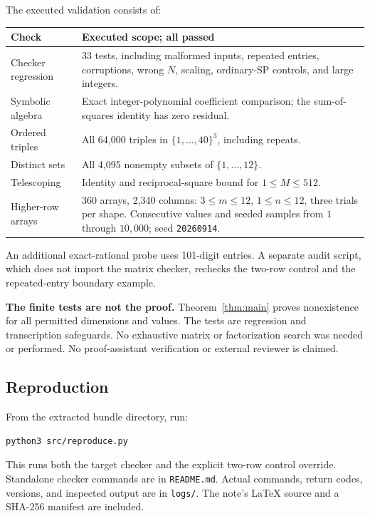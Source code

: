 \documentclass[11pt]{article}
\begin{document}
The executed validation consists of:
\begin{center}
\small
\begin{tabular}{@{}lp{10cm}@{}}
\toprule
Check & Executed scope; all passed\\
\midrule
Checker regression & 33 tests, including malformed inputs, repeated entries,
corruptions, wrong $N$, scaling, ordinary-SP controls, and large integers.\\[3pt]
Symbolic algebra & Exact integer-polynomial coefficient comparison; the
sum-of-squares identity has zero residual.\\[3pt]
Ordered triples & All 64,000 triples in $\{1,\ldots,40\}^3$, including repeats.\\[3pt]
Distinct sets & All 4,095 nonempty subsets of $\{1,\ldots,12\}$.\\[3pt]
Telescoping & Identity and reciprocal-square bound for $1\le M\le512$.\\[3pt]
Higher-row arrays & 360 arrays, 2,340 columns: $3\le m\le12$, $1\le n\le12$,
three trials per shape. Consecutive values and seeded samples from
$1$ through $10{,}000$; seed \texttt{20260914}.\\
\bottomrule
\end{tabular}
\end{center}
An additional exact-rational probe uses 101-digit entries. A separate audit
script, which does not import the matrix checker, rechecks the two-row
control and the repeated-entry boundary example.

\textbf{The finite tests are not the proof.} Theorem~\ref{thm:main} proves
nonexistence for all permitted dimensions and values. The tests are regression
and transcription safeguards. No exhaustive matrix or factorization search
was needed or performed. No proof-assistant verification or external reviewer
is claimed.

\subsection*{Reproduction}
From the extracted bundle directory, run:
\begin{verbatim}
python3 src/reproduce.py
\end{verbatim}
This runs both the target checker and the explicit two-row control override.
Standalone checker commands are in \texttt{README.md}. Actual commands,
return codes, versions, and inspected output are in \texttt{logs/}.
The note's \LaTeX{} source and a SHA-256 manifest are included.
\end{document}
